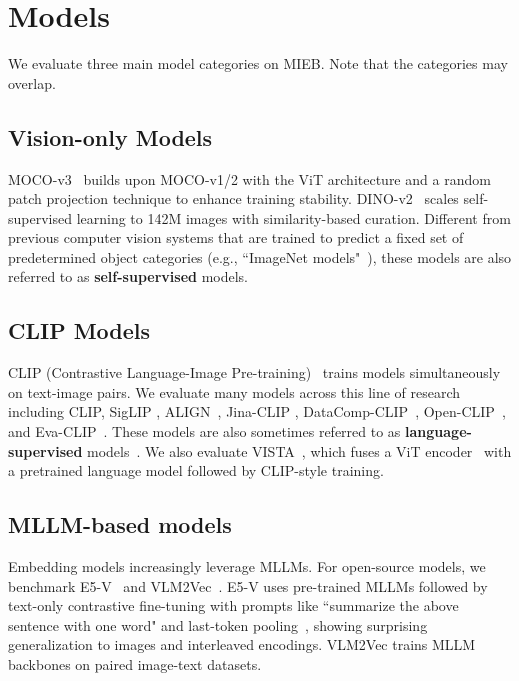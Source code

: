 \section{Models}
\label{sec:models}



We evaluate three main model categories on MIEB. Note that the categories may overlap.

\subsection{Vision-only Models}

MOCO-v3~\citep{chen2021empirical} builds upon MOCO-v1/2 with the ViT architecture and a random patch projection technique to enhance training stability. DINO-v2~\citep{oquab2024dinov2} scales self-supervised learning to 142M images with similarity-based curation. Different from previous computer vision systems that are trained to predict a fixed set of predetermined object categories (e.g., ``ImageNet models"~\citep{kornblith2019betterimagenetmodelstransfer}), these models are also referred to as \textbf{self-supervised} models.

\subsection{CLIP Models}

CLIP (Contrastive Language-Image Pre-training)~\citep{radford2021learning} trains models simultaneously on text-image pairs. We evaluate many models across this line of research including CLIP, SigLIP \citep{zhai2023sigmoid}, ALIGN~\cite{jia2021scaling}, Jina-CLIP \citep{koukounas2024jina}, DataComp-CLIP~\citep{gadre2024datacomp}, Open-CLIP~\citep{cherti2023reproducible}, and Eva-CLIP~\citep{sun2023eva}. These models are also sometimes referred to as \textbf{language-supervised} models~\citep{radford2021learning,tong2024cambrian}. We also evaluate VISTA~\citep{zhou2024vista}, which fuses a ViT encoder~\citep{dosovitskiy2020image} with a pretrained language model followed by CLIP-style training.

\subsection{MLLM-based models}

Embedding models increasingly leverage MLLMs. For open-source models, we benchmark E5-V~\citep{jiang2024e5} and VLM2Vec~\citep{jiang2024vlm2vec}. E5-V uses pre-trained MLLMs followed by text-only contrastive fine-tuning with prompts like ``summarize the above sentence with one word" and last-token pooling~\citep{neelakantan2022text,muennighoff2022sgpt}, showing surprising generalization to images and interleaved encodings. VLM2Vec trains MLLM backbones on paired image-text datasets.

